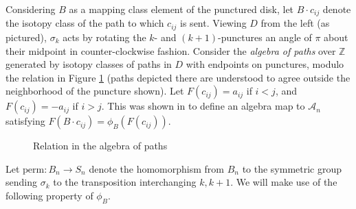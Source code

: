 \documentclass[11pt]{amsart}
\def\Z{{\mathbb Z}}
\def\cl{\mathcal}
\def\s{{\sigma}}
\begin{document}
  Considering $B$ as a mapping class element of the punctured disk, let $B\cdot c_{ij}$ denote the isotopy class of the path to which $c_{ij}$ is sent. Viewing $D$ from the left (as pictured), $\s_k$ acts by rotating the $k\textrm{-}$ and $(k+1)\textrm{-}$punctures an angle of $\pi$ about their midpoint in counter-clockwise fashion. Consider the \emph{algebra of paths} over $\Z$ generated by isotopy classes of paths in $D$ with endpoints on punctures, modulo the relation in Figure \ref{FigRelnPathAlg} (paths depicted there are understood to agree outside the neighborhood of the puncture shown). Let $F(c_{ij})=a_{ij}$ if $i<j$, and $F(c_{ij})=-a_{ij}$ if $i>j$. This was shown in \cite{Ng05} to define an algebra map to $\cl A_n$ satisfying $F(B\cdot c_{ij}) = \phi_B(F(c_{ij}))$.

  \begin{figure}[ht]
\caption{Relation in the algebra of paths}
\label{FigRelnPathAlg}
\end{figure}
  
  Let $\text{perm}:B_n\to S_n$ denote the homomorphism from $B_n$ to the symmetric group sending $\s_k$ to the transposition interchanging $k, k+1$. We will make use of the following property of $\phi_B$.
\end{document}

